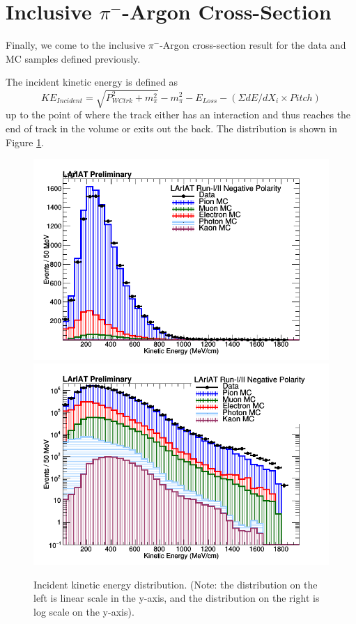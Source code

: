 \section{Inclusive $\pi^{-}$-Argon Cross-Section} \label{sec:CrossSection}
Finally, we come to the inclusive $\pi^{-}$-Argon cross-section result for the data and MC samples defined previously.

The incident kinetic energy is defined as
\begin{equation}
KE_{Incident} = \sqrt{P_{WCtrk}^2 + m_{\pi}^2} - m_{\pi}^2 - E_{Loss} - (\Sigma dE/dX_{i} \times Pitch)
\end{equation}
up to the point of where the track either has an interaction and thus reaches the end of track in the volume or exits out the back. The distribution is shown in Figure \ref{fig:IncidentEnergy}.

\begin{figure}[h!]
\centering
\includegraphics[scale=0.30]{./images/IncidentKE.png}
\includegraphics[scale=0.30]{./images/IncidentKELog.png}
\caption{Incident kinetic energy distribution. (Note: the distribution on the left is linear scale in the y-axis, and the distribution on the right is log scale on the y-axis).}
\label{fig:IncidentEnergy}
\end{figure}

